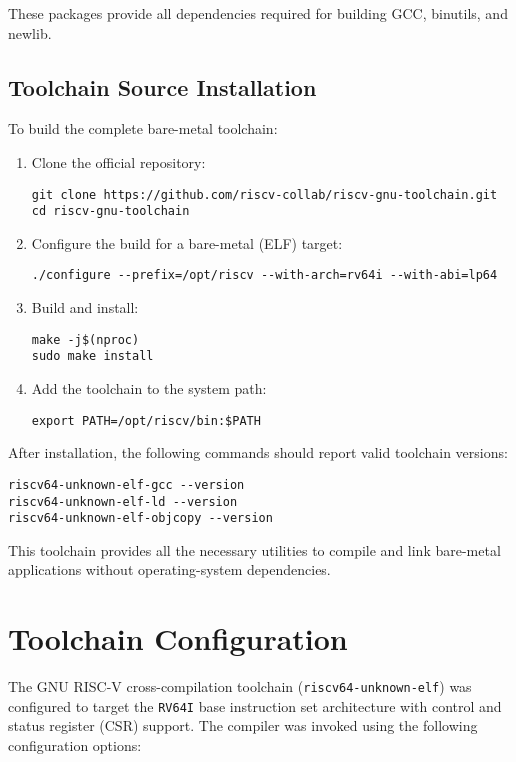 These packages provide all dependencies required for building GCC, binutils, and newlib.

\subsection{Toolchain Source Installation}
To build the complete bare-metal toolchain:

\begin{enumerate}
\item Clone the official repository:
\begin{verbatim}
git clone https://github.com/riscv-collab/riscv-gnu-toolchain.git
cd riscv-gnu-toolchain
\end{verbatim}

\item Configure the build for a bare-metal (ELF) target:
\begin{verbatim}
./configure --prefix=/opt/riscv --with-arch=rv64i --with-abi=lp64
\end{verbatim}

\item Build and install:
\begin{verbatim}
make -j$(nproc)
sudo make install
\end{verbatim}

\item Add the toolchain to the system path:
\begin{verbatim}
export PATH=/opt/riscv/bin:$PATH
\end{verbatim}
\end{enumerate}

After installation, the following commands should report valid toolchain versions:
\begin{verbatim}
riscv64-unknown-elf-gcc --version
riscv64-unknown-elf-ld --version
riscv64-unknown-elf-objcopy --version
\end{verbatim}

This toolchain provides all the necessary utilities to compile and link bare-metal applications without operating-system dependencies.

\section{Toolchain Configuration}
The GNU RISC-V cross-compilation toolchain (\texttt{riscv64-unknown-elf}) was configured to target the \texttt{RV64I} base instruction set architecture with control and status register (CSR) support.  
The compiler was invoked using the following configuration options:


